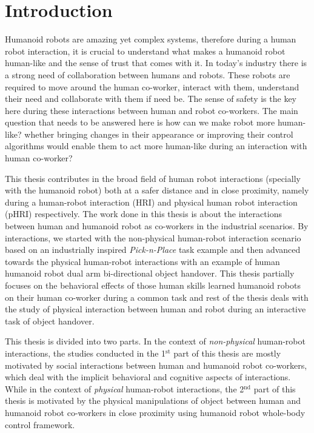 
{\color{blue}\chapter*{Introduction}}
\pagestyle{plain}

Humanoid robots are amazing yet complex systems, therefore during a human robot interaction, it is crucial to understand what makes a humanoid robot human-like and the sense of trust that comes with it. In today's industry there is a strong need of collaboration between humans and robots. These robots are required to move around the human co-worker, interact with them, understand their need and collaborate with them if need be. The sense of safety is the key here during these interactions between human and robot co-workers. The main question that needs to be answered here is how can we make robot more human-like? whether bringing changes in their appearance or improving their control algorithms would enable them to act more human-like during an interaction with human co-worker?

This thesis contributes in the broad field of human robot interactions (specially with the humanoid robot) both at a safer distance and in close proximity, namely during a human-robot interaction (HRI) and physical human robot interaction (pHRI) respectively. The work done in this thesis is about the interactions between human and humanoid robot as co-workers in the industrial scenarios. By interactions, we started with the non-physical human-robot interaction scenario based on an industrially inspired \textit{Pick-n-Place} task example and then advanced towards the physical human-robot interactions with an example of human humanoid robot dual arm bi-directional object handover. This thesis partially focuses on the behavioral effects of those human skills learned humanoid robots on their human co-worker during a common task and rest of the thesis deals with the study of physical interaction between human and robot during an interactive task of object handover.

This thesis is divided into two parts. In the context of \textit{non-physical} human-robot interactions, the studies conducted in the 1$^\text{st}$ part of this thesis are mostly motivated by social interactions between human and humanoid robot co-workers, which deal with the implicit behavioral and cognitive aspects of interactions. While in the context of \textit{physical} human-robot interactions, the 2$^\text{nd}$ part of this thesis is motivated by the physical manipulations of object between human and humanoid robot co-workers in close proximity using humanoid robot whole-body control framework.


